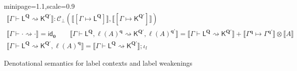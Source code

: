 \documentclass[acmsmall,screen,anonymous,review]{acmart}
\newcommand{\mc}[1]{\ensuremath{\mathcal{#1}}}
\newcommand{\mb}[1]{\ensuremath{\mathbf{#1}}}
\newcommand{\ms}[1]{\ensuremath{\mathsf{#1}}}
\newcommand{\cwk}[2]{#1 \mapsto #2}
\newcommand{\lwk}[3]{#1 \vdash #2 \rightsquigarrow #3}
\newcommand{\lhyp}[2]{#1(#2)}
\newcommand{\ltoty}[2]{[#1 \mapsto #2]}
\newcommand{\dnt}[1]{\llbracket{#1}\rrbracket}
\begin{document}
\begin{figure}
  \begin{adjustbox}{minipage=1.1\textwidth,scale=0.9}
  \begin{gather*}
    \boxed{\dnt{\lwk{\Gamma}{\ms{L}^{\mb{Q}}}{\ms{K}^{\mb{Q}'}}} 
      : \mc{C}_\bot(\dnt{\ltoty{\Gamma}{\ms{L}^{\mb{Q}}}}, 
                    \dnt{\ltoty{\Gamma}{\ms{K}^{\mb{Q}'}}})} \\
    \dnt{\lwk{\Gamma}{\cdot}{\cdot}} = \ms{id}_{\mb{0}} \qquad
    \dnt
      {\lwk{\Gamma}{\ms{L}^{\mb{Q}}, \lhyp{\ell}{A}^{\mb{q}}}
      {\ms{K}^{\mb{Q}'}, \lhyp{\ell}{A}^{\mb{q}'}}}
    = \dnt{\lwk{\Gamma}{\ms{L}^{\mb{Q}}}{\ms{K}^{\mb{Q}'}}} 
      + \dnt{\cwk{\Gamma^{\mb{q}}}{\Gamma^{\mb{q}'}}} \otimes \dnt{A} \\
    \dnt
      {\lwk{\Gamma}{\ms{L}^{\mb{Q}}}
      {\ms{K}^{\mb{Q}'}, \lhyp{\ell}{A}^{\mb{q}}}}
    = \dnt{\lwk{\Gamma}{\ms{L}^{\mb{Q}}}{\ms{K}^{\mb{Q}'}}} ; \iota_l
  \end{gather*}
  \end{adjustbox}
  \caption{Denotational semantics for label contexts and label weakenings}
  \Description{}
  \label{fig:lwk-densem}
\end{figure}
\end{document}
